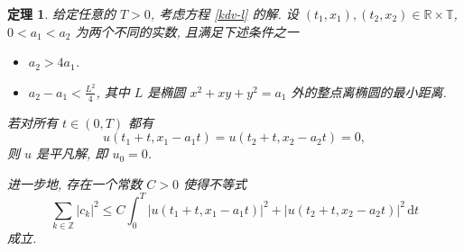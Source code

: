 \documentclass[master]{cugthesis}
\newcommand\R{\ensuremath{\mathbb{R}}}
\newcommand\Z{\ensuremath{\mathbb{Z}}}
\newcommand\T{\ensuremath{\mathbb{T}}}
\renewcommand\d{\ensuremath{\,\mathrm{d}}}
\newtheorem{theorem}{定理}[chapter]
\begin{document}
    
    \begin{theorem}
    给定任意的 $T>0$, 考虑方程 \eqref{kdv-l} 的解. 设 $(t_1,x_1), (t_2,x_2)\in \R\times \T$, $0<a_1<a_2$ 为两个不同的实数, 且满足下述条件之一  
\begin{itemize}
    \item [\rm{(1)}] $a_2>4a_1$.
    \item [\rm{(2)}] $a_2-a_1<\frac{L^2}{4}$, 其中 $L$ 是椭圆 $x^2+xy+y^2=a_1$ 外的整点离椭圆的最小距离.
\end{itemize}
 若对所有 $t\in (0,T)$ 都有
    \begin{equation*}
        u(t_1+t,x_1-a_1t)=u(t_2+t,x_2-a_2t)=0,
    \end{equation*}
    则 $u$ 是平凡解, 即 $u_0=0$. 
    
    进一步地, 存在一个常数 $C>0$ 使得不等式
    \begin{equation}\label{3-2-10}
        \sum_{k\in\Z} |c_k|^2\le C\int_0^T|u(t_1+t,x_1-a_1t)|^2+|u(t_2+t,x_2-a_2t)|^2 \d t
    \end{equation}
    成立.
    \end{theorem}
\end{document}
